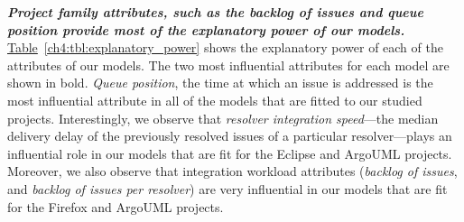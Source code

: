 \noindent\textbf{\textit{Project family attributes, such as the backlog of
issues and queue position provide most of the explanatory power of our models.}}
\hyperref[ch4:tbl:explanatory_power]{Table}~\ref{ch4:tbl:explanatory_power} shows the
explanatory power of each of the attributes of our models. The two most
influential attributes for each model are shown in bold. \textit{Queue
position}, \ie the time at which an issue is addressed is the most influential
attribute in all of the models that are fitted to our studied projects.
Interestingly, we observe that \textit{resolver integration speed}---the median
delivery delay of the previously resolved issues of a particular
resolver---plays an influential role in our models that are fit for the Eclipse
and ArgoUML projects. Moreover, we also observe that integration workload
attributes (\ie \textit{backlog of issues}, and \textit{backlog of issues per
resolver}) are very influential in our models that are fit for the Firefox and
ArgoUML projects.\\

